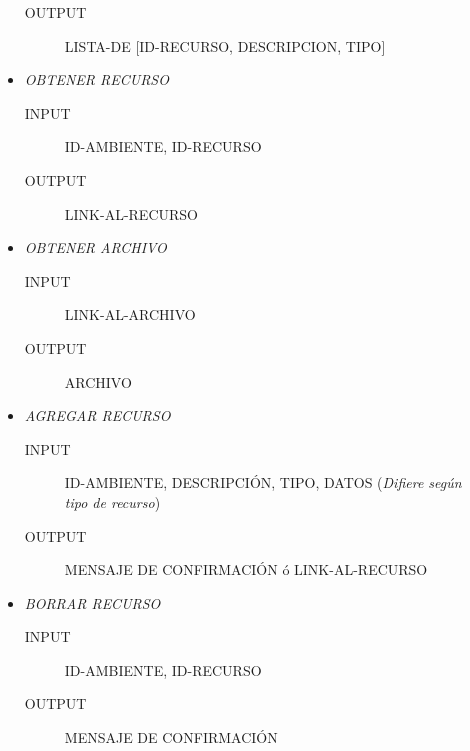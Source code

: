 \documentclass{article}
\begin{document}
\begin{description}
\begin{itemize}
\begin{description}
				\item[OUTPUT] LISTA-DE [ID-RECURSO, DESCRIPCION, TIPO]
			\end{description}
			\item \emph{OBTENER RECURSO}
			\begin{description}
				\item[INPUT] ID-AMBIENTE, ID-RECURSO
				\item[OUTPUT] LINK-AL-RECURSO
			\end{description}
			\item \emph{OBTENER ARCHIVO}
			\begin{description}
				\item[INPUT] LINK-AL-ARCHIVO
				\item[OUTPUT] ARCHIVO
			\end{description}
			\item \emph{AGREGAR RECURSO}
			\begin{description}
				\item[INPUT] ID-AMBIENTE, DESCRIPCI\'ON, TIPO, DATOS (\emph{Difiere seg\'un tipo de recurso})
				\item[OUTPUT] MENSAJE DE CONFIRMACI\'ON \'o LINK-AL-RECURSO
			\end{description}
			\item \emph{BORRAR RECURSO}
			\begin{description}
				\item[INPUT] ID-AMBIENTE, ID-RECURSO
				\item[OUTPUT] MENSAJE DE CONFIRMACI\'ON
			\end{description}
		\end{itemize}
	\end{description}
\end{document}
